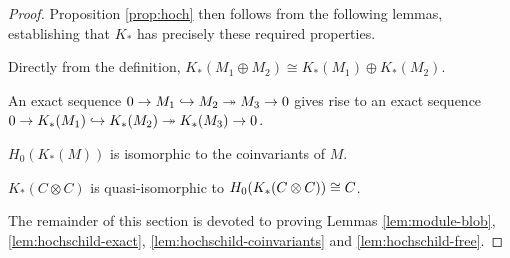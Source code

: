 \begin{proof}
%

Proposition \ref{prop:hoch} then follows from the following lemmas, 
establishing that $K_*$ has precisely these required properties.
\begin{lem}
\label{lem:hochschild-additive}%
Directly from the definition, $K_*(M_1 \oplus M_2) \cong K_*(M_1) \oplus K_*(M_2)$.
\end{lem}
\begin{lem}
\label{lem:hochschild-exact}%
An exact sequence $0 \to M_1 \hookrightarrow M_2 \twoheadrightarrow M_3 \to 0$ gives rise to an
exact sequence $0 \to K_*(M_1) \hookrightarrow K_*(M_2) \twoheadrightarrow K_*(M_3) \to 0$.
\end{lem}
\begin{lem}
\label{lem:hochschild-coinvariants}%
$H_0(K_*(M))$ is isomorphic to the coinvariants of $M$.
\end{lem}
\begin{lem}
\label{lem:hochschild-free}%
$K_*(C\otimes C)$ is quasi-isomorphic to $H_0(K_*(C \otimes C)) \cong C$.
\end{lem}

The remainder of this section is devoted to proving Lemmas
\ref{lem:module-blob},
\ref{lem:hochschild-exact}, \ref{lem:hochschild-coinvariants} and
\ref{lem:hochschild-free}.
\end{proof}

